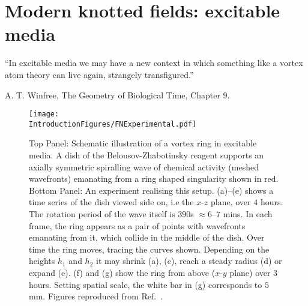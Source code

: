 \section{Modern knotted fields: excitable media}
\label{sec:FN}

\setlength{\epigraphwidth}{5in} 
\epigraph{``In excitable media we may have a new context in which something like a vortex atom theory can live again, strangely transfigured.''}{A. T. Winfree, The Geometry of Biological Time, Chapter 9.}
\begin{figure}[htbp]
\centering
\texttt{[image: \\IntroductionFigures/FNExperimental.pdf]}
\caption{Top Panel: Schematic illustration of a vortex ring in excitable media. A dish of the Belousov-Zhabotinsky reagent supports an axially symmetric spiralling wave of chemical activity (meshed wavefronts) emanating from a ring shaped singularity shown in red. Bottom Panel: An experiment realising this setup. (a)--(e) shows a time series of the dish viewed side on, i.e the $x$-$z$ plane, over $4$ hours. The rotation period of the wave itself is $390$s $\approx 6$--$ 7 $ mins. In each frame, the ring appears as a pair of points with wavefronts emanating from it, which collide in the middle of the dish. Over time the ring moves, tracing the curves shown. Depending on the heights $h_1$ and $h_2$ it may shrink (a), (c), reach a steady radius (d) or expand (e). (f) and (g) show the ring from above ($x$-$y$ plane) over $3$ hours. Setting spatial scale, the white bar in (g) corresponds to $5$ mm. Figures reproduced from Ref.~\citep{Totz2015}.}
\label{fig:FNExperimental}
\end{figure}

